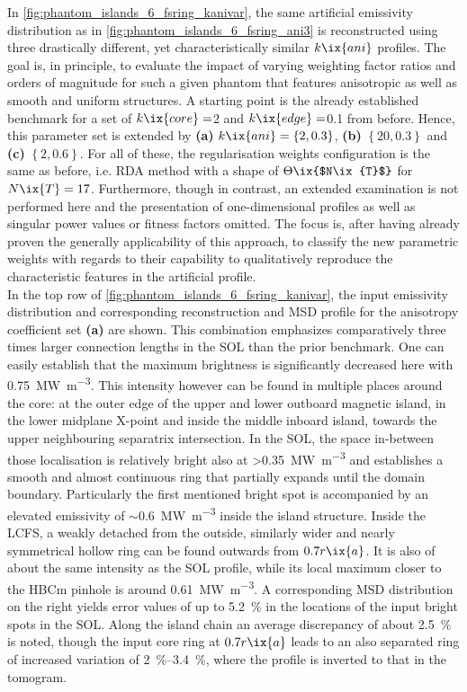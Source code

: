 %
                In \cref{fig:phantom_islands_6_fsring_kanivar}, the same artificial emissivity distribution as in \cref{fig:phantom_islands_6_fsring_ani3} is reconstructed using three drastically different, yet characteristically similar $k\ix{ani}$ profiles. The goal is, in principle, to evaluate the impact of varying weighting factor ratios and orders of magnitude for such a given phantom that features anisotropic as well as smooth and uniform structures. A starting point is the already established benchmark for a set of $k\ix{core}=$\SI{2}{\arbitraryunit} and $k\ix{edge}=$\SI{0.1}{\arbitraryunit} from before. Hence, this parameter set is extended by \textbf{(a)} $k\ix{ani}=\left\{2, 0.3\right\}$, \textbf{(b)} $\left\{20, 0.3\right\}$ and \textbf{(c)} $\left\{2, 0.6\right\}$. For all of these, the regularisation weights configuration is the same as before, i.e. RDA method with a shape of $\Theta\ix{$N\ix{T}$}$ for $N\ix{T}=17$. Furthermore, though in contrast, an extended examination is not performed here and the presentation of one-dimensional profiles as well as singular power values or fitness factors omitted. The focus is, after having already proven the generally applicability of this approach, to classify the new parametric weights with regards to their capability to qualitatively reproduce the characteristic features in the artificial profile.\\%
                In the top row of \cref{fig:phantom_islands_6_fsring_kanivar}, the input emissivity distribution and corresponding reconstruction and MSD profile for the anisotropy coefficient set \textbf{(a)} are shown. This combination emphasizes comparatively three times larger connection lengths in the SOL than the prior benchmark. One can easily establish that the maximum brightness is significantly decreased here with \SI{0.75}{\mega\watt\per\cubic\meter}. This intensity however can be found in multiple places around the core: at the outer edge of the upper and lower outboard magnetic island, in the lower midplane X-point and inside the middle inboard island, towards the upper neighbouring separatrix intersection. In the SOL, the space in-between those localisation is relatively bright also at >\SI{0.35}{\mega\watt\per\cubic\meter} and establishes a smooth and almost continuous ring that partially expands until the domain boundary. Particularly the first mentioned bright spot is accompanied by an elevated emissivity of $\sim$\SI{0.6}{\mega\watt\per\cubic\meter} inside the island structure. Inside the LCFS, a weakly detached from the outside, similarly wider and nearly symmetrical hollow ring can be found outwards from $0.7r\ix{a}$. It is also of about the same intensity as the SOL profile, while its local maximum closer to the HBCm pinhole is around \SI{0.61}{\mega\watt\per\cubic\meter}. A corresponding MSD distribution on the right yields error values of up to \SI{5.2}{\percent} in the locations of the input bright spots in the SOL. Along the island chain an average discrepancy of about \SI{2.5}{\percent} is noted, though the input core ring at $0.7r\ix{a}$ leads to an also separated ring of increased variation of \SIrange{2}{3.4}{\percent}, where the profile is inverted to that in the tomogram.\\%
